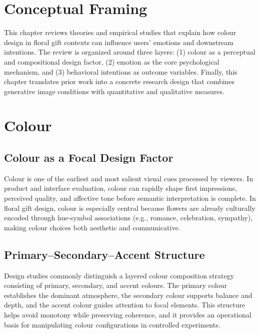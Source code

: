
\section{Conceptual Framing}

This chapter reviews theories and empirical studies that explain how colour design in floral gift contexts can influence users' emotions and downstream intentions. The review is organized around three layers: (1) colour as a perceptual and compositional design factor, (2) emotion as the core psychological mechanism, and (3) behavioral intentions as outcome variables. Finally, this chapter translates prior work into a concrete research design that combines generative image conditions with quantitative and qualitative measures.

\section{Colour}

\subsection{Colour as a Focal Design Factor}

Colour is one of the earliest and most salient visual cues processed by viewers. In product and interface evaluation, colour can rapidly shape first impressions, perceived quality, and affective tone before semantic interpretation is complete. In floral gift design, colour is especially central because flowers are already culturally encoded through hue-symbol associations (e.g., romance, celebration, sympathy), making colour choices both aesthetic and communicative.

\subsection{Primary--Secondary--Accent Structure}

Design studies commonly distinguish a layered colour composition strategy consisting of primary, secondary, and accent colours. The primary colour establishes the dominant atmosphere, the secondary colour supports balance and depth, and the accent colour guides attention to focal elements. This structure helps avoid monotony while preserving coherence, and it provides an operational basis for manipulating colour configurations in controlled experiments.

